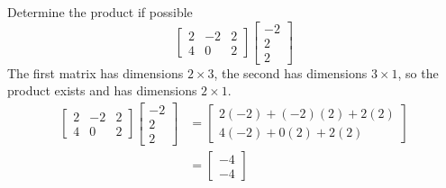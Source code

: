 \documentclass[letterpaper,12pt]{article}
\begin{document}
\begin{example}
Determine the product if possible
\begin{equation*}
    \begin{bmatrix} 2 & -2 & 2 \\ 4 & 0 & 2 \end{bmatrix} \begin{bmatrix} -2 \\ 2 \\ 2 \end{bmatrix}
\end{equation*}
The first matrix has dimensions $2 \times 3$, the second has dimensions $3 \times 1$, so the product exists and has dimensions $2 \times 1$.
\begin{align*}
    \begin{bmatrix} 2 & -2 & 2 \\ 4 & 0 & 2 \end{bmatrix} \begin{bmatrix} -2 \\ 2 \\ 2 \end{bmatrix} & = \begin{bmatrix} 2(-2) + (-2)(2) + 2(2) \\ 4(-2) + 0(2) + 2(2) \end{bmatrix} \\
    & = \begin{bmatrix} -4 \\ -4 \end{bmatrix}
\end{align*}
\end{example}
\end{document}
